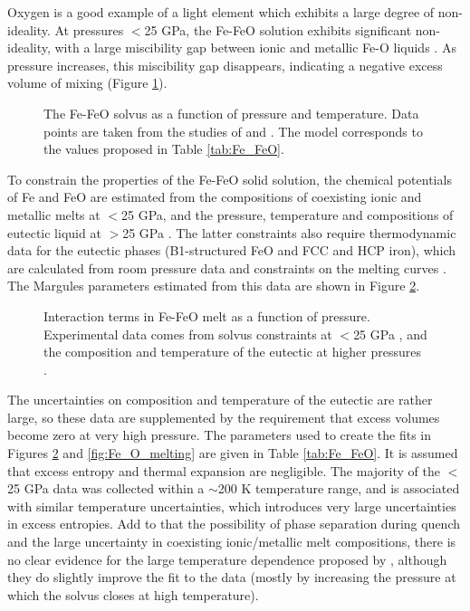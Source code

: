 Oxygen is a good example of a light element which exhibits a large degree of non-ideality. At pressures $<$25 GPa, the Fe-FeO solution exhibits significant non-ideality, with a large miscibility gap between ionic and metallic Fe-O liquids \citep{KS1995,TOT2007,Frostetal2010}. As pressure increases, this miscibility gap disappears, indicating a negative excess volume of mixing (Figure \ref{fig:Fe_O_solvus}).

\begin{figure}[ht!]
  \centering
  \caption{The Fe-FeO solvus as a function of pressure and temperature. Data points are taken from the studies of \cite{TOT2007} and \cite{Frostetal2010}. The model corresponds to the values proposed in Table \ref{tab:Fe_FeO}.}
  \label{fig:Fe_O_solvus}
\end{figure}

To constrain the properties of the Fe-FeO solid solution, the chemical potentials of Fe and FeO are estimated from the compositions of coexisting ionic and metallic melts at $<$25 GPa, and the pressure, temperature and compositions of eutectic liquid at $>$25 GPa \citep{SHCPW2008}. The latter constraints also require thermodynamic data for the eutectic phases (B1-structured FeO and FCC and HCP iron), which are calculated from room pressure data and constraints on the melting curves \citep{SHCPW2008, OTHOH2011, ADMLM2013, Kom2014}.  The Margules parameters estimated from this data are shown in Figure \ref{fig:Fe_O_interaction}. 

\begin{figure}[ht!]
  \centering
  \caption{Interaction terms in Fe-FeO melt as a function of pressure. Experimental data comes from solvus constraints at $<$25 GPa \citep{TOT2007,Frostetal2010}, and the composition and temperature of the eutectic at higher pressures \citep{SHCPW2008}.}
  \label{fig:Fe_O_interaction}
\end{figure}

The uncertainties on composition and temperature of the eutectic are rather large, so these data are supplemented by the requirement that excess volumes become zero at very high pressure. The parameters used to create the fits in Figures \ref{fig:Fe_O_interaction} and \ref{fig:Fe_O_melting} are given in Table \ref{tab:Fe_FeO}. It is assumed that excess entropy and thermal expansion are negligible. The majority of the $<$25 GPa data was collected within a $\sim$200 K temperature range, and is associated with similar temperature uncertainties, which introduces very large uncertainties in excess entropies. Add to that the possibility of phase separation during quench and the large uncertainty in coexisting ionic/metallic melt compositions, there is no clear evidence for the large temperature dependence proposed by \cite{Frostetal2010}, although they do slightly improve the fit to the data (mostly by increasing the pressure at which the solvus closes at high temperature).

